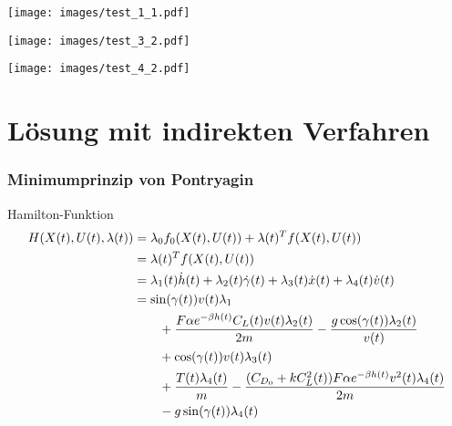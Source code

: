 \documentclass[aspectratio=169]{beamer}
\begin{document}
\begin{frame}
  \texttt{[image: images/test\_1\_1.pdf]}
\end{frame}

\begin{frame}
  \texttt{[image: images/test\_3\_2.pdf]}
\end{frame}

\begin{frame}
  \texttt{[image: images/test\_4\_2.pdf]}
\end{frame}


\section{Lösung mit indirekten Verfahren}
\begin{frame}
  \frametitle{Minimumprinzip von Pontryagin}
  \scriptsize
  \begin{block}{Hamilton-Funktion}  
 \begin{align*} 
        H(X(t),U(t),\lambda(t)) &= \lambda_0 f_0(X(t),U(t)) + \lambda(t)^T f(X(t),U(t)) \\\
        &= \lambda(t)^T f(X(t),U(t)) \\\
        &= \lambda_1(t) \dot{h}(t) + \lambda_2(t) \dot{\gamma}(t) + \lambda_3(t) \dot{x}(t) + \lambda_4(t) \dot{v}(t) \\\
        &= \sin(\gamma(t)) v(t) \lambda_1 \\\
        &\hspace{7mm} + \dfrac{F \alpha e^{-\beta h(t)} C_L(t) v(t) \lambda_2(t)}{2m} - \dfrac{g \cos(\gamma(t)) \lambda_2(t)}{v(t)} \\\
        &\hspace{7mm} + \cos(\gamma(t)) v(t) \lambda_3(t) \\\
        &\hspace{7mm} + \dfrac{T(t) \lambda_4(t)}{m} - \dfrac{(C_{D_0} + k C_L^2(t)) F \alpha e^{-\beta h(t)} v^2(t) \lambda_4(t)}{2m} \\\
        &\hspace{7mm} - g \sin(\gamma(t)) \lambda_4(t)
\end{align*}
\end{block}
\end{frame}
\end{document}
